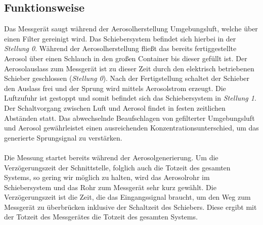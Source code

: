 \subsection{Funktionsweise}
Das Messger\"{a}t saugt w\"{a}hrend der Aerosolherstellung Umgebungsluft, welche \"{u}ber einen Filter gereinigt wird. Das Schiebersystem befindet sich hierbei in der \textit{Stellung 0}. W\"{a}hrend der Aerosolherstellung flie{\ss}t das bereits fertiggestellte Aerosol \"{u}ber einen Schlauch in den gro{\ss}en Container bis dieser gef\"{u}llt ist. Der Aerosolauslass zum Messger\"{a}t ist zu dieser Zeit durch den elektrisch betriebenen Schieber geschlossen (\textit{Stellung 0}). Nach der Fertigstellung schaltet der Schieber den Auslass frei und der Sprung wird mittels Aerosolstrom erzeugt. Die Luftzufuhr ist gestoppt und somit befindet sich das Schiebersystem in \textit{Stellung 1}. Der Schaltvorgang zwischen Luft und Aerosol findet in festen zeitlichen Abst\"{a}nden statt. Das abwechselnde Beaufschlagen von gefilterter Umgebungsluft und Aerosol gew\"{a}hrleistet einen ausreichenden Konzentrationsunterschied, um das generierte Sprungsignal zu verst\"{a}rken.
\\\\
Die Messung startet bereits w\"{a}hrend der Aerosolgenerierung. Um die Verz\"{o}gerungszeit der Schnittstelle, folglich auch die Totzeit des gesamten Systems, so gering wir m\"{o}glich zu halten, wird das Aerosolrohr im Schiebersystem und das Rohr zum Messger\"{a}t sehr kurz gew\"{a}hlt. Die Verz\"{o}gerungszeit ist die Zeit, die das Eingangssignal braucht, um den Weg zum Messger\"{a}t zu \"{u}berbr\"{u}cken inklusive der Schaltzeit des Schiebers. Diese ergibt mit der Totzeit des Messger\"{a}tes die Totzeit des gesamten Systems.
